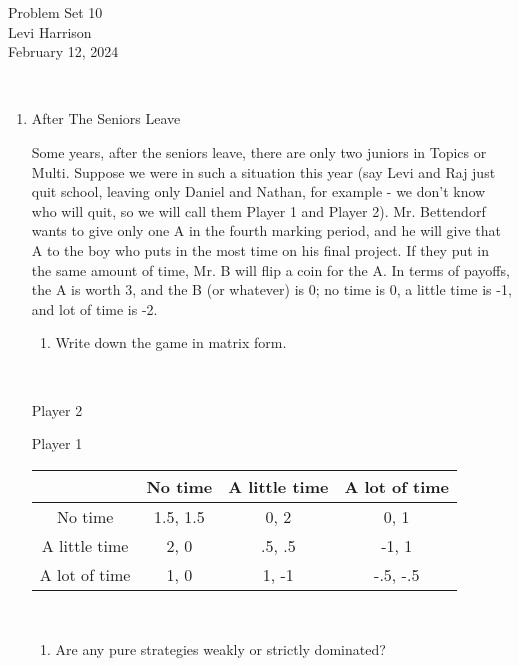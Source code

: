 \documentclass{article}
\begin{document}
\begin{center}
    \LARGE{Problem Set 10}\\[0.5em]
    \large{Levi Harrison}\\[0.5em]
    \small{February 12, 2024}
\end{center}

\,

\begin{enumerate}
    \item After The Seniors Leave

          Some years, after the seniors leave, there are only two juniors in Topics or Multi. Suppose we were in such a situation this year (say Levi and Raj just quit school, leaving only Daniel and Nathan, for example - we don't know who will quit, so we will call them Player 1 and Player 2). Mr. Bettendorf wants to give only one A in the fourth marking period, and he will give that A to the boy who puts in the most time on his final project. If they put in the same amount of time, Mr. B will flip a coin for the A. In terms of payoffs, the A is worth 3, and the B (or whatever) is 0; no time is 0, a little time is -1, and lot of time is -2.

          \begin{enumerate}[label=(\alph*)]
              \item Write down the game in matrix form.
          \end{enumerate}

          \,

          \centerline{Player 2}
          \begin{center}
              Player 1
              \begin{tabular}{|c|c|c|c|}
                  \hline
                                & No time  & A little time & A lot of time \\ \hline
                  No time       & 1.5, 1.5 & 0, 2          & 0, 1          \\ \hline
                  A little time & 2, 0     & .5, .5        & -1, 1         \\ \hline
                  A lot of time & 1, 0     & 1, -1         & -.5, -.5      \\ \hline
              \end{tabular}
          \end{center}

          \,

          \begin{enumerate}[resume]
              \item Are any pure strategies weakly or strictly dominated?
          \end{enumerate}


\end{enumerate}
\end{document}
